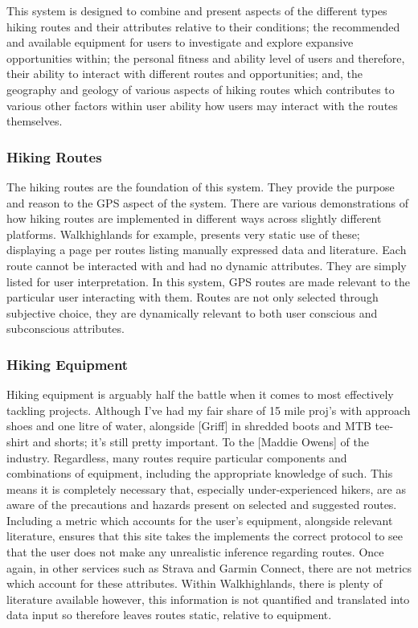 \documentclass[11pt, english]{article}
\begin{document}
	This system is designed to combine and present aspects of the different types hiking routes and their attributes relative to their conditions; the recommended and available equipment for users to investigate and explore expansive opportunities within; the personal fitness and ability level of users and therefore, their ability to interact with different routes and opportunities; and, the geography and geology of various aspects of hiking routes which contributes to various other factors within user ability how users may interact with the routes themselves. 

		\subsubsection{Hiking Routes}

		The hiking routes are the foundation of this system. They provide the purpose and reason to the GPS aspect of the system. There are various demonstrations of how hiking routes are implemented in different ways across slightly different platforms. Walkhighlands for example, presents very static use of these; displaying a page per routes listing manually expressed data and literature. Each route cannot be interacted with and had no dynamic attributes. They are simply listed for user interpretation. In this system, GPS routes are made relevant to the particular user interacting with them. Routes are not only selected through subjective choice, they are dynamically relevant to both user conscious and subconscious attributes.

		\subsubsection{Hiking Equipment}

		Hiking equipment is arguably half the battle when it comes to most effectively tackling projects. Although I've had my fair share of 15 mile proj's with approach shoes and one litre of water, alongside [Griff] in shredded boots and MTB tee-shirt and shorts; it's still pretty important. To the [Maddie Owens] of the industry. Regardless, many routes require particular components and combinations of equipment, including the appropriate knowledge of such. This means it is completely necessary that, especially under-experienced hikers, are as aware of the precautions and hazards present on selected and suggested routes. Including a metric which accounts for the user's equipment, alongside relevant literature, ensures that this site takes the implements the correct protocol to see that the user does not make any unrealistic inference regarding routes. Once again, in other services such as Strava and Garmin Connect, there are not metrics which account for these attributes. Within Walkhighlands, there is plenty of literature available however, this information is not quantified and translated into data input so therefore leaves routes static, relative to equipment.
\end{document}
